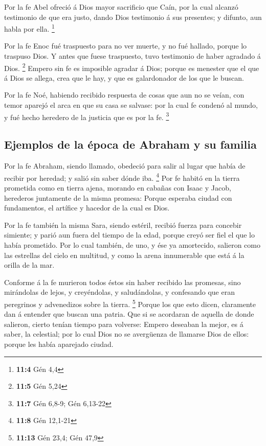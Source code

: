  Por la fe Abel ofreció á Dios mayor sacrificio que Caín,
por la cual alcanzó testimonio de que era justo, dando Dios testimonio á
sus presentes; y difunto, aun habla por ella. \footnote{\textbf{11:4}
  Gén 4,4}

 Por la fe Enoc fué traspuesto para no ver muerte, y no fué
hallado, porque lo traspuso Dios. Y antes que fuese traspuesto, tuvo
testimonio de haber agradado á Dios. \footnote{\textbf{11:5} Gén 5,24}
 Empero sin fe es imposible agradar á Dios; porque es
menester que el que á Dios se allega, crea que le hay, y que es
galardonador de los que le buscan.

 Por la fe Noé, habiendo recibido respuesta de cosas que aun
no se veían, con temor aparejó el arca en que su casa se salvase: por la
cual fe condenó al mundo, y fué hecho heredero de la justicia que es por
la fe. \footnote{\textbf{11:7} Gén 6,8-9; Gén 6,13-22}

\hypertarget{ejemplos-de-la-uxe9poca-de-abraham-y-su-familia}{%
\subsection{Ejemplos de la época de Abraham y su
familia}\label{ejemplos-de-la-uxe9poca-de-abraham-y-su-familia}}

 Por la fe Abraham, siendo llamado, obedeció para salir al
lugar que había de recibir por heredad; y salió sin saber dónde iba.
\footnote{\textbf{11:8} Gén 12,1-21}  Por fe habitó en la
tierra prometida como en tierra ajena, morando en cabañas con Isaac y
Jacob, herederos juntamente de la misma promesa:  Porque
esperaba ciudad con fundamentos, el artífice y hacedor de la cual es
Dios.

 Por la fe también la misma Sara, siendo estéril, recibió
fuerza para concebir simiente; y parió aun fuera del tiempo de la edad,
porque creyó ser fiel el que lo había prometido.  Por lo
cual también, de uno, y ése ya amortecido, salieron como las estrellas
del cielo en multitud, y como la arena innumerable que está á la orilla
de la mar.

 Conforme á la fe murieron todos éstos sin haber recibido
las promesas, sino mirándolas de lejos, y creyéndolas, y saludándolas, y
confesando que eran peregrinos y advenedizos sobre la tierra.
\footnote{\textbf{11:13} Gén 23,4; Gén 47,9}  Porque los
que esto dicen, claramente dan á entender que buscan una patria.
 Que si se acordaran de aquella de donde salieron, cierto
tenían tiempo para volverse:  Empero deseaban la mejor, es
á saber, la celestial; por lo cual Dios no se avergüenza de llamarse
Dios de ellos: porque les había aparejado ciudad.

